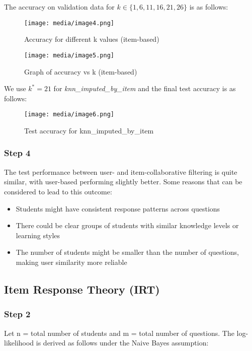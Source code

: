 \documentclass{article}
\begin{document}
The accuracy on validation data for $k \in \{1, 6, 11, 16, 21, 26\}$ is as follows:

\begin{figure}[htbp]
\centering
\texttt{[image: media/image4.png]}
\caption{Accuracy for different k values (item-based)}
\end{figure}

\begin{figure}[htbp]
\centering
\texttt{[image: media/image5.png]}
\caption{Graph of accuracy vs k (item-based)}
\end{figure}

We use $k^* = 21$ for \textit{knn\_imputed\_by\_item} and the final test accuracy is as follows:

\begin{figure}[htbp]
\centering
\texttt{[image: media/image6.png]}
\caption{Test accuracy for knn\_imputed\_by\_item}
\end{figure}

\subsubsection{Step 4}
The test performance between user- and item-collaborative filtering is quite similar, with user-based performing slightly better. Some reasons that can be considered to lead to this outcome:

\begin{itemize}
\item Students might have consistent response patterns across questions
\item There could be clear groups of students with similar knowledge levels or learning styles
\item The number of students might be smaller than the number of questions, making user similarity more reliable
\end{itemize}

\subsection{Item Response Theory (IRT)}

\subsubsection{Step 2}
Let n = total number of students and m = total number of questions. The log-likelihood is derived as follows under the Naive Bayes assumption:
\end{document}
